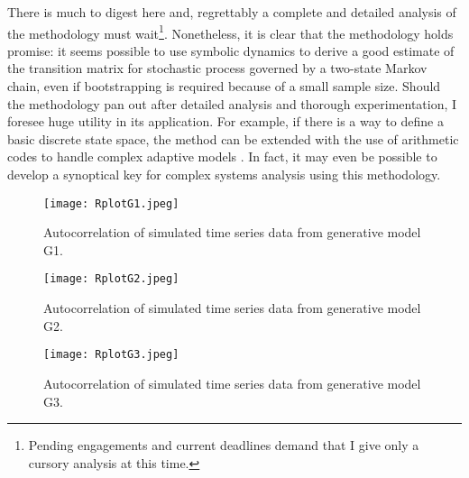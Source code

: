 \documentclass[letter,11pt]{article}
\begin{document}
There is much to digest here and, regrettably a complete and detailed analysis of the methodology must wait\footnote{Pending engagements and current deadlines demand that I give only a cursory analysis at this time.}. Nonetheless, it is clear that the methodology holds promise: it seems possible to use symbolic dynamics to derive a good estimate of the transition matrix for stochastic process governed by a two-state Markov chain, even if bootstrapping is required because of a small sample size. Should the methodology pan out after detailed analysis and thorough experimentation, I foresee huge utility in its application. For example, if there is a way to define a basic discrete state space, the method can be extended with the use of arithmetic codes to handle complex adaptive models \cite{mackay_information_2003}. In fact, it may even be possible to develop a synoptical key for complex systems analysis using this methodology.

\begin{figure}
  \begin{center}
    \texttt{[image: RplotG1.jpeg]}
    \label{fig:}
    \caption{Autocorrelation of simulated time series data from generative model G1.}
  \end{center}
\end{figure}

\begin{figure}
  \begin{center}
    \texttt{[image: RplotG2.jpeg]}
    \label{fig:}
    \caption{Autocorrelation of simulated time series data from generative model G2.}
  \end{center}
\end{figure}

\begin{figure}
  \begin{center}
    \texttt{[image: RplotG3.jpeg]}
    \label{fig:}
    \caption{Autocorrelation of simulated time series data from generative model G3.}
  \end{center}
\end{figure}
\end{document}
